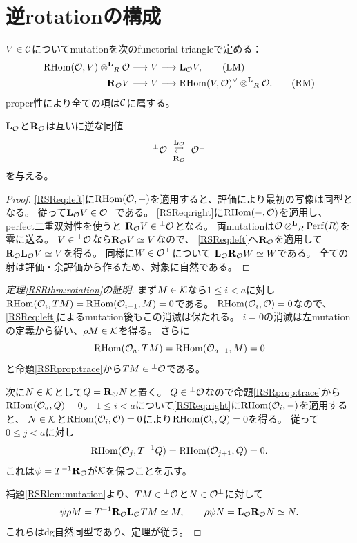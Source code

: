 \section{逆rotationの構成}\label{RSRsec:rotation}
$V\in\mathcal C$についてmutationを次のfunctorial triangleで定める：
\begin{align}
 \operatorname{RHom}(\mathcal O,V)\mathbin{\otimes^{\mathbf L}}_R\mathcal O&\longrightarrow V
       \longrightarrow\mathbf L_{\mathcal O}V,\label{RSReq:left}\tag{LM}\\
 \mathbf R_{\mathcal O}V&\longrightarrow V
       \longrightarrow\operatorname{RHom}(V,\mathcal O)^\vee\mathbin{\otimes^{\mathbf L}}_R\mathcal O.
       \label{RSReq:right}\tag{RM}
\end{align}
proper性により全ての項は$\mathcal C$に属する。

\begin{lemma}[直交圏間のmutation]\label{RSRlem:mutation}
$\mathbf L_{\mathcal O}$と$\mathbf R_{\mathcal O}$は互いに逆な同値
\[
 {}^\perp\OO\ \underset{\RR_{\OO}}{\stackrel{\LL_{\OO}}{\rightleftarrows}}\ \OO^\perp
\]
を与える。
\end{lemma}
\begin{proof}
\eqref{RSReq:left}に$\operatorname{RHom}(\mathcal O,-)$を適用すると、評価により最初の写像は同型となる。
従って$\mathbf L_{\mathcal O}V\in\mathcal O^\perp$である。
\eqref{RSReq:right}に$\operatorname{RHom}(-,\mathcal O)$を適用し、perfect二重双対性を使うと
$\mathbf R_{\mathcal O}V\in{}^\perp\mathcal O$となる。
両mutationは$\mathcal O\mathbin{\otimes^{\mathbf L}}_R\operatorname{Perf}(R)$を零に送る。
$V\in{}^\perp\mathcal O$なら$\mathbf R_{\mathcal O}V\simeq V$なので、
\eqref{RSReq:left}へ$\mathbf R_{\mathcal O}$を適用して
$\mathbf R_{\mathcal O}\mathbf L_{\mathcal O}V\simeq V$を得る。
同様に$W\in\mathcal O^\perp$について
$\mathbf L_{\mathcal O}\mathbf R_{\mathcal O}W\simeq W$である。
全ての射は評価・余評価から作るため、対象に自然である。
\end{proof}

\begin{proof}[定理\ref{RSRthm:rotation}の証明]
まず$M\in\mathcal K$なら$1\le i<a$に対し
$\operatorname{RHom}(\mathcal O_i,TM)=\operatorname{RHom}(\mathcal O_{i-1},M)=0$である。
$\operatorname{RHom}(\mathcal O_i,\mathcal O)=0$なので、\eqref{RSReq:left}によるmutation後もこの消滅は保たれる。
$i=0$の消滅は左mutationの定義から従い、$\rho M\in\mathcal K$を得る。
さらに
\[
 \operatorname{RHom}(\mathcal O_a,TM)=\operatorname{RHom}(\mathcal O_{a-1},M)=0
\]
と命題\ref{RSRprop:trace}から$TM\in{}^\perp\mathcal O$である。

次に$N\in\mathcal K$として$Q=\mathbf R_{\mathcal O}N$と置く。
$Q\in{}^\perp\mathcal O$なので命題\ref{RSRprop:trace}から$\operatorname{RHom}(\mathcal O_a,Q)=0$。
$1\le i<a$について\eqref{RSReq:right}に$\operatorname{RHom}(\mathcal O_i,-)$を適用すると、
$N\in\mathcal K$と$\operatorname{RHom}(\mathcal O_i,\mathcal O)=0$により$\operatorname{RHom}(\mathcal O_i,Q)=0$を得る。
従って$0\le j<a$に対し
\[
 \operatorname{RHom}(\mathcal O_j,T^{-1}Q)=\operatorname{RHom}(\mathcal O_{j+1},Q)=0.
\]
これは$\psi=T^{-1}\mathbf R_{\mathcal O}$が$\mathcal K$を保つことを示す。

補題\ref{RSRlem:mutation}より、$TM\in{}^\perp\mathcal O$と$N\in\mathcal O^\perp$に対して
\[
 \psi\rho M=T^{-1}\mathbf R_{\mathcal O}\mathbf L_{\mathcal O}TM\simeq M,
 \qquad
 \rho\psi N=\mathbf L_{\mathcal O}\mathbf R_{\mathcal O}N\simeq N.
\]
これらはdg自然同型であり、定理が従う。
\end{proof}

